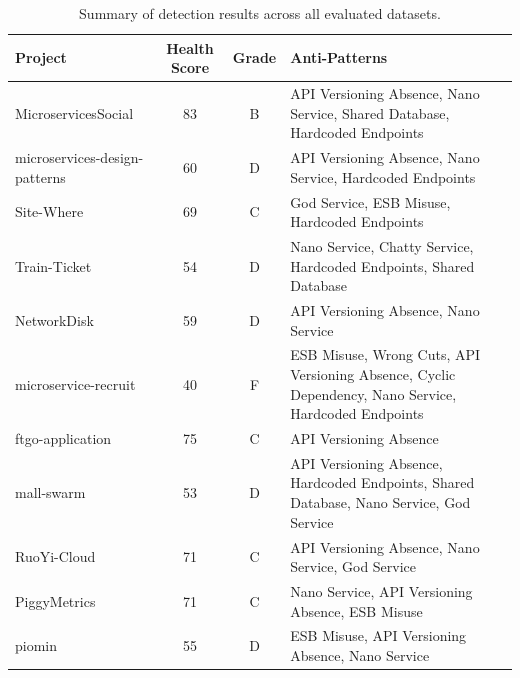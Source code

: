 \begin{table}[htbp]
    \centering
    \footnotesize
    \begin{tabularx}{\textwidth}{|l|c|c|X|}
        \hline
        \textbf{Project} & \textbf{Health Score} & \textbf{Grade} & \textbf{Anti-Patterns} \\
        \hline\hline
        MicroservicesSocial & 83 & B & API Versioning Absence, Nano Service, Shared Database, Hardcoded Endpoints \\
        \hline
        microservices-design-patterns & 60 & D & API Versioning Absence, Nano Service, Hardcoded Endpoints \\
        \hline
        Site-Where & 69 & C & God Service, ESB Misuse, Hardcoded Endpoints \\
        \hline
        Train-Ticket & 54 & D & Nano Service, Chatty Service, Hardcoded Endpoints, Shared Database \\
        \hline
        NetworkDisk & 59 & D & API Versioning Absence, Nano Service \\
        \hline
        microservice-recruit & 40 & F & ESB Misuse, Wrong Cuts, API Versioning Absence, Cyclic Dependency, Nano Service, Hardcoded Endpoints \\
        \hline
        ftgo-application & 75 & C & API Versioning Absence \\
        \hline
        mall-swarm & 53 & D & API Versioning Absence, Hardcoded Endpoints, Shared Database, Nano Service, God Service \\
        \hline
        RuoYi-Cloud & 71 & C & API Versioning Absence, Nano Service, God Service \\
        \hline
        PiggyMetrics & 71 & C & Nano Service, API Versioning Absence, ESB Misuse \\
        \hline
        piomin & 55 & D & ESB Misuse, API Versioning Absence, Nano Service \\
        \hline
    \end{tabularx}
    \caption{Summary of detection results across all evaluated datasets.}
    \label{tab:results-overview}
\end{table}

